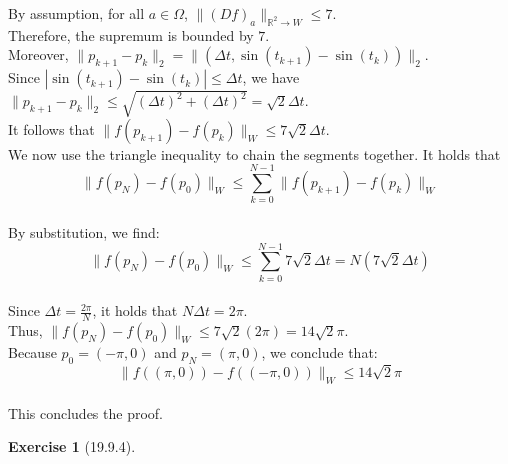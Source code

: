 \documentclass[11pt,a4paper]{article}
\theoremstyle{definition}
\newtheorem{exercise}{Exercise}
\theoremstyle{plain}
\theoremstyle{remark}
\begin{document}
\noindent By assumption, for all $a \in \Omega$, $\|(Df)_a\|_{\mathbb{R}^2 \to W} \le 7$.\\
Therefore, the supremum is bounded by $7$.\\
Moreover, $\|p_{k+1} - p_k\|_2 = \|\left(\Delta t, \sin(t_{k+1}) - \sin(t_k)\right)\|_2$.\\
Since $|\sin(t_{k+1}) - \sin(t_k)| \le \Delta t$, we have $\|p_{k+1} - p_k\|_2 \le \sqrt{(\Delta t)^2 + (\Delta t)^2} = \sqrt{2}\Delta t$.\\
It follows that $\|f(p_{k+1}) - f(p_k)\|_W \le 7\sqrt{2}\Delta t$.\\

\noindent We now use the triangle inequality to chain the segments together. It holds that
$$\|f(p_N) - f(p_0)\|_W \le \sum_{k=0}^{N-1} \|f(p_{k+1}) - f(p_k)\|_W$$\\
By substitution, we find:
$$\|f(p_N) - f(p_0)\|_W \le \sum_{k=0}^{N-1} 7\sqrt{2}\Delta t = N \left(7\sqrt{2} \Delta t\right)$$\\
Since $\Delta t = \frac{2\pi}{N}$, it holds that $N \Delta t = 2\pi$.\\
Thus, $\|f(p_N) - f(p_0)\|_W \le 7\sqrt{2}(2\pi) = 14\sqrt{2}\pi$.\\
Because $p_0 = (-\pi, 0)$ and $p_N = (\pi, 0)$, we conclude that:
$$\|f((\pi, 0)) - f((-\pi, 0))\|_W \le 14\sqrt{2}\pi$$\\
This concludes the proof.

\begin{exercise}[19.9.4]
\end{exercise}
\end{document}

